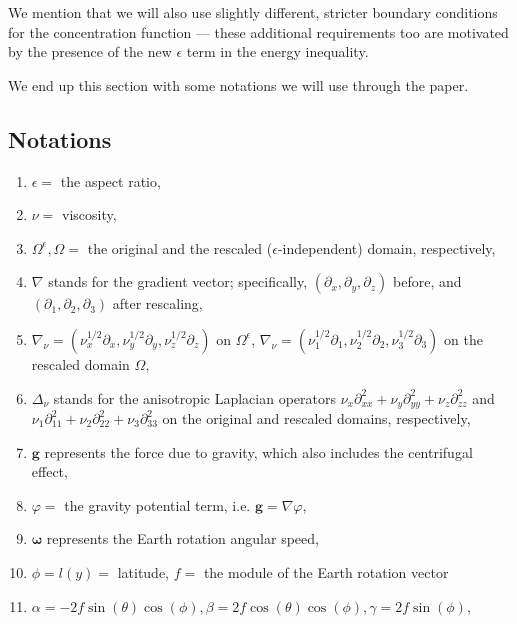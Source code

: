 \documentclass[11pt]{article}
\begin{document}
We mention that we will also use slightly different, stricter boundary conditions for the concentration function --- these additional requirements too are motivated by the presence of the new $\epsilon$ term in the energy inequality.

We end up this section with some notations we will use through the paper.

\subsection{Notations}

\begin{enumerate}

\item $\epsilon = $ the aspect ratio,
\item $\nu = $ viscosity,
\item $\Omega^\epsilon, \Omega = $ the original and the rescaled ($\epsilon$-independent) domain, respectively,
\item $\nabla$ stands for the gradient vector; specifically, $(\partial_x, \partial_y, \partial_z)$ before, and $(\partial_1, \partial_2, \partial_3)$ after rescaling,
\item $\nabla_\nu = (\nu_x^{1/2} \partial_x, \nu_y^{1/2} \partial_y, \nu_z^{1/2} \partial_z)$ on $\Omega^\epsilon$, $\nabla_\nu = (\nu_1^{1/2} \partial_1, \nu_2^{1/2} \partial_2, \nu_3^{1/2} \partial_3)$ on the rescaled domain $\Omega,$
\item $ \Delta_\nu$ stands for the anisotropic Laplacian operators $\nu_x \partial^2_{xx} + \nu_y \partial^2_{yy}  + \nu_z \partial^2_{zz}$ and $\nu_1 \partial^2_{11} + \nu_2 \partial^2_{22}  + \nu_3 \partial^2_{33}$ on the original and rescaled domains, respectively,
\item $\mathbf{g}$ represents the force due to gravity, which also includes the centrifugal effect,
\item $\varphi = $ the gravity potential term, i.e. $\mathbf{g} = \nabla \varphi,$
\item $\mathbf{\omega}$ represents the Earth rotation angular speed,
\item $\phi = l(y) = $ latitude, $f = $ the module of the Earth rotation vector
\item $\alpha = -2 f \sin(\theta)\cos(\phi), \beta = 2 f \cos(\theta) \cos(\phi), \gamma = 2 f \sin(\phi),$

\end{enumerate}
\end{document}
